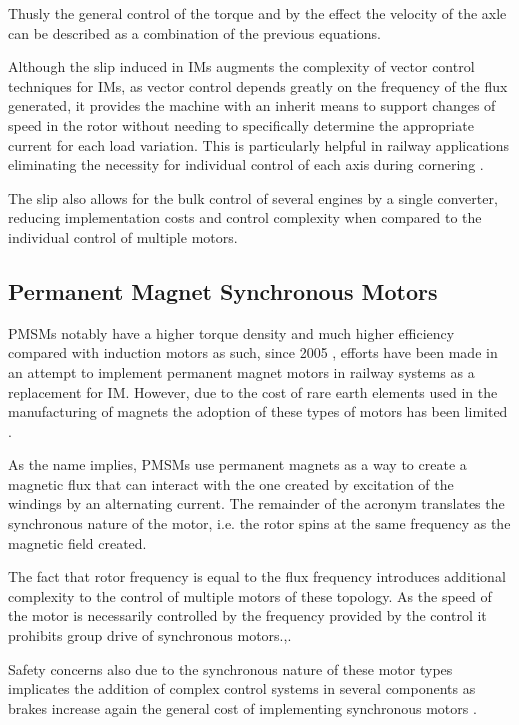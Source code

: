 Thusly the general control of the torque and by the effect the velocity of the axle can be described as a combination of the previous equations.

Although the slip induced in IMs augments the complexity of vector control techniques for IMs, as vector control depends greatly on the frequency of the flux generated, it provides the machine with an inherit means to support changes of speed in the rotor without needing to specifically determine the appropriate current for each load variation. This is particularly helpful in railway applications eliminating the necessity for individual control of each axis during cornering \cite{MainSOTA}.

The slip also allows for the bulk control of several engines by a single converter, reducing implementation costs and control complexity when compared to the individual control of multiple motors\cite{Motor-SOTA}.

\subsection{Permanent Magnet Synchronous Motors}
PMSMs notably have a higher torque density and much higher efficiency compared with induction motors as such, since 2005 \cite{Motor-SOTA}, efforts have been made in an attempt to implement permanent magnet motors in railway systems as a replacement for IM. However, due to the cost of rare earth elements used in the manufacturing of magnets the adoption of these types of motors has been limited \cite{MainSOTA}.

As the name implies, PMSMs use permanent magnets as a way to create a magnetic flux that can interact with the one created by excitation of the windings by an alternating current. The remainder of the acronym  translates the synchronous nature of the motor, i.e. the rotor spins at the same frequency as the magnetic field created.

The fact that rotor frequency is equal to the flux frequency introduces additional complexity to the control of multiple motors of these topology. As the speed of the motor is necessarily controlled by the frequency provided by the control it prohibits group drive of synchronous motors.\cite{MainSOTA},\cite{Motor-SOTA}. 

Safety concerns also due to the synchronous nature of these motor types implicates the addition of complex control systems in several components as brakes increase again the general cost of implementing synchronous motors \cite{Motor-SOTA}.

